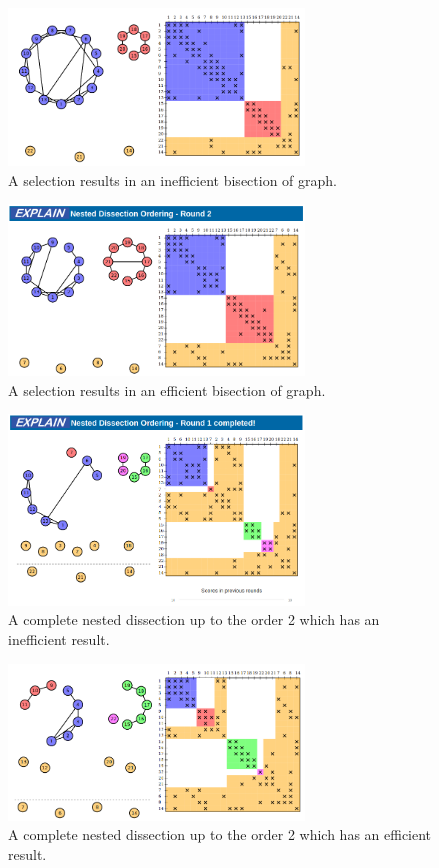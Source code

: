 \documentclass[12pt, twoside]{book}
\begin{document}
\begin{figure}
\centering
\includegraphics[width=0.7\textwidth]{bad_bisection}
\caption{A selection results in an inefficient bisection of graph.}
\label{bad_bisection}
\end{figure}

\begin{figure}
\centering
\includegraphics[width=0.7\textwidth]{good_bisection}
\caption{A selection results in an efficient bisection of graph.}
\label{good_bisection}
\end{figure}

\begin{figure}
\centering
\includegraphics[width=0.7\textwidth]{bad_disection}
\caption{A complete nested dissection up to the order 2 which has an
inefficient result.}
\label{bad_disection}
\end{figure}


\begin{figure}
\centering
\includegraphics[width=0.7\textwidth]{good_disection}
\caption{A complete nested dissection up to the order 2 which has an
efficient result.}
\label{good_disection}
\end{figure}
\end{document}
